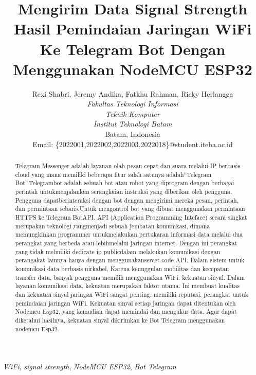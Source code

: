 \documentclass[conference]{IEEEtran}
\title{Mengirim Data Signal Strength Hasil Pemindaian Jaringan WiFi Ke Telegram Bot Dengan Menggunakan NodeMCU ESP32}
\author{Rexi Shabri\IEEEauthorrefmark{1}, Jeremy Andika\IEEEauthorrefmark{2}, Fatkhu Rahman\IEEEauthorrefmark{3}, Ricky Herlangga\IEEEauthorrefmark{4}\\
\textit{Fakultas Teknologi Informasi}\\
\textit{Teknik Komputer}\\
\textit{Institut Teknologi Batam}\\
Batam, Indonesia\\
Email: \{\IEEEauthorrefmark{1}2022001,\IEEEauthorrefmark{2}2022002,\IEEEauthorrefmark{3}2022003,\IEEEauthorrefmark{4}2022018\}@student.iteba.ac.id}
\begin{document}
\maketitle
\begin{abstract}
    Telegram Messenger adalah layanan olah pesan cepat dan suara melalui IP berbasis cloud yang mana memiliki beberapa fitur salah satunya adalah“Telegram Bot”.Telegrambot adalah sebuah bot atau robot yang diprogram dengan berbagai perintah untukmenjalankan serangkaian instruksi yang diberikan oleh pengguna. Pengguna dapatberinteraksi dengan bot dengan mengirimi mereka pesan, perintah, dan permintaan sebaris.Untuk mengontrol bot yang dibuat menggunakan permintaan HTTPS ke Telegram BotAPI. API (Application Programming Inteface) secara singkat merupakan teknologi yangmenjadi sebuah jembatan komunikasi, dimana memungkinkan programmer untukmelakukan pertukaran informasi data melalui dua perangkat yang berbeda atau lebihmelalui jaringan internet. Dengan ini perangkat yang tidak melmiliki dedicate ip publicdalam melakukan komunikasi dengan perangakat lainnya hanya dengan menggunakansercet code API. Dalam sistem untuk komunikasi data berbasis nirkabel,
    Karena keunggulan mobilitas dan kecepatan transfer data, banyak pengguna memilih menggunakan WiFi. kekuatan sinyal.
    Dalam layanan komunikasi data, kekuatan merupakan faktor utama.
    Ini membuat kualitas dan kekuatan sinyal jaringan WiFi sangat penting.
    memiliki reputasi. perangkat untuk pemindaian jaringan WiFi.
    Kekuatan sinyal setiap jaringan dapat ditentukan oleh Nodemcu Esp32, yang kemudian dapat memindai dan mengukur data.
    Agar dapat diketahui hasilnya, kekuatan sinyal dikirimkan ke Bot Telegram menggunakan nodemcu Esp32.
\end{abstract}
\vspace{0.2cm}
\begin{IEEEkeywords}
    \emph{WiFi}, \emph{signal strength}, \emph{NodeMCU ESP32}, \emph{Bot Telegram}
\end{IEEEkeywords}
\end{document}
